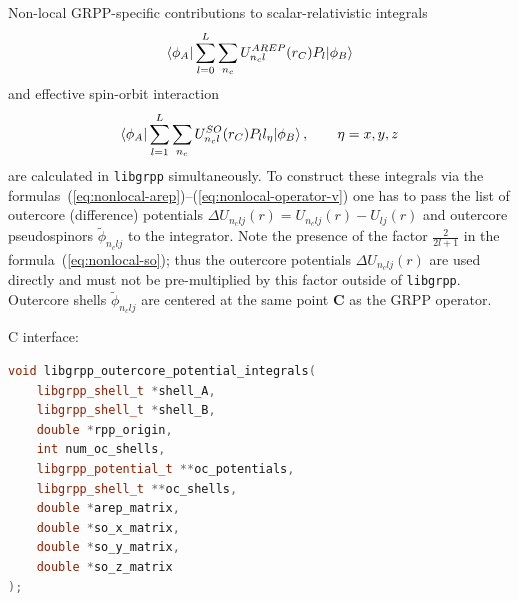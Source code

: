 \documentclass[12pt]{article}
\begin{document}
Non-local GRPP-specific contributions to scalar-relativistic integrals
%
\begin{equation}
\braket{\phi_A|\sum_{l=0}^L \sum_{n_c} U^{AREP}_{n_c l}(r_C) P_l|\phi_B}
\label{eq:def-ocpot-arep-ints}
\end{equation}
%
and effective spin-orbit interaction
%
\begin{equation}
\braket{\phi_A|\sum_{l=1}^L \sum_{n_c} U^{SO}_{n_c l}(r_C) P_l l_\eta|\phi_B}, \quad\quad \eta=x,y,z
\label{eq:def-ocpot-so-ints}
\end{equation}
%
are calculated in \texttt{libgrpp} simultaneously. To construct these integrals via the formulas~(\ref{eq:nonlocal-arep})--(\ref{eq:nonlocal-operator-v}) one has to pass the list of outercore (difference) potentials $\Delta U_{n_c lj}(r) = U_{n_c lj}(r) - U_{lj}(r)$ and outercore pseudospinors $\tilde{\phi}_{n_c lj}$ to the integrator. Note the presence of the factor $\frac{2}{2l+1}$ in the formula~(\ref{eq:nonlocal-so}); thus the outercore potentials $\Delta U_{n_c lj}(r)$ are used directly and must not be pre-multiplied by this factor outside of \texttt{libgrpp}. Outercore shells $\tilde{\phi}_{n_c lj}$ are centered at the same point $\bm{C}$ as the GRPP operator.

C interface:
\begin{lstlisting}[language=C++]
void libgrpp_outercore_potential_integrals(
    libgrpp_shell_t *shell_A,
    libgrpp_shell_t *shell_B,
    double *rpp_origin,
    int num_oc_shells,
    libgrpp_potential_t **oc_potentials,
    libgrpp_shell_t **oc_shells,
    double *arep_matrix,
    double *so_x_matrix,
    double *so_y_matrix,
    double *so_z_matrix
);
\end{lstlisting}
\end{document}
